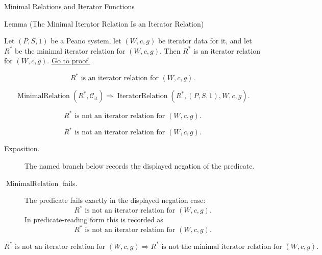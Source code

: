 \begin{topicbox}{Minimal Relations and Iterator Functions}
\begin{lemmabox}{Lemma (The Minimal Iterator Relation Is an Iterator Relation)}
\begin{lemma}
\label{lem:iterator-relation-consistency}
Let $(P,S,1)$ be a Peano system, let $(W,c,g)$ be iterator data for it, and let
$R^*$ be the minimal iterator relation for $(W,c,g)$. Then $R^*$ is an
iterator relation for $(W,c,g)$.
\hyperref[prf:iterator-relation-consistency]{Go to proof.}
\end{lemma}
\end{lemmabox}

\begin{remark*}
\[
R^* \text{ is an iterator relation for } (W,c,g).
\]
\end{remark*}

\begin{remark*}
\[
\operatorname{MinimalRelation}(R^*,\mathcal C_{\mathrm{it}})
\Longrightarrow
\operatorname{IteratorRelation}(R^*,(P,S,1),W,c,g).
\]
\end{remark*}

\begin{remark*}
\[
R^* \text{ is not an iterator relation for } (W,c,g).
\]
\end{remark*}

\begin{remark*}
\[
  R^* \text{ is not an iterator relation for } (W,c,g).
\]
\end{remark*}

\begin{remark*}
\begin{description}
  \item[Exposition.] The named branch below records the displayed negation of the predicate.
  \item[\(\operatorname{MinimalRelation}\) fails.] The predicate fails exactly in the displayed negation case:
  \[
  R^* \text{ is not an iterator relation for } (W,c,g).
  \]
  In predicate-reading form this is recorded as
  \[
    R^* \text{ is not an iterator relation for } (W,c,g).
  \]
\end{description}
\end{remark*}

\begin{remark*}
\[
R^* \text{ is not an iterator relation for } (W,c,g)
\Longrightarrow
R^* \text{ is not the minimal iterator relation for } (W,c,g).
\]
\end{remark*}


\end{topicbox}
